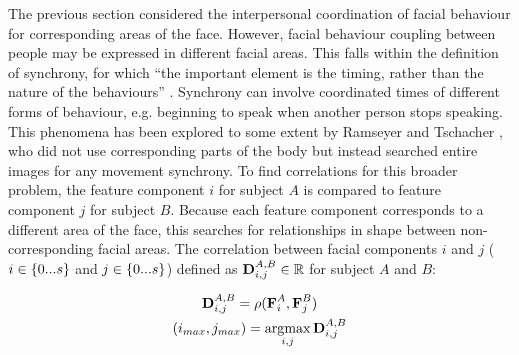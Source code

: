 The previous section considered the interpersonal coordination of facial behaviour for corresponding areas of the face. However, facial behaviour coupling between people may be expressed in different facial areas. This falls within the definition of synchrony, for which ``the important element is the timing, rather than the nature of the behaviours'' \cite{Delaherche2012}. Synchrony can involve coordinated times of different forms of behaviour, e.g. beginning to speak when another person stops speaking. This phenomena has been explored to some extent by Ramseyer and Tschacher \cite{Ramseyer2008}, who did not use corresponding parts of the body but instead searched entire images for any movement synchrony. To find correlations for this broader problem, the feature component $i$ for subject $A$ is compared to feature component $j$ for subject $B$. Because each feature component corresponds to a different area of the face, this searches for relationships in shape between non-corresponding facial areas. The correlation between facial components $i$ and $j$ ($i \in \{0...s\}$ and $j \in \{0...s\}$) defined as $\textbf{D}^{A,B}_{i,j} \in \mathbb{R}$ for subject $A$ and $B$:

\begin{gather}
\textbf{D}^{A,B}_{i,j} = \rho(\textbf{F}^A_i, \textbf{F}^B_j) \\
(i_{max}, j_{max}) = \operatorname*{\arg\!\max}_{i,j}{\textbf{D}^{A,B}_{i,j}}
\end{gather}

